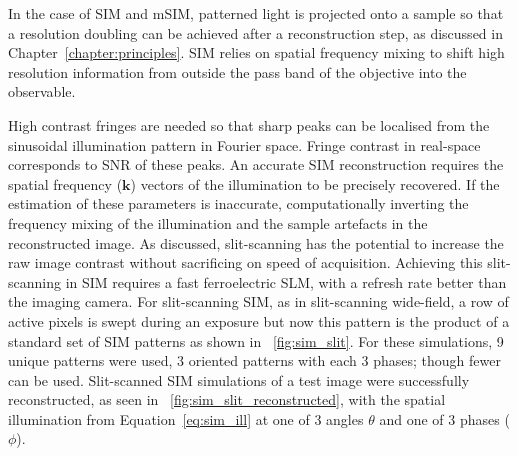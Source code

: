 In the case of \gls{SIM} and \gls{mSIM}, patterned light is projected onto a sample so that a resolution doubling can be achieved after a reconstruction step, as discussed in Chapter~\ref{chapter:principles}.
\gls{SIM} relies on spatial frequency mixing to shift high resolution information from outside the pass band of the objective into the observable.

High contrast fringes are needed so that sharp peaks can be localised from the sinusoidal illumination pattern in Fourier space.
Fringe contrast in real-space corresponds to \gls{SNR} of these peaks.
An accurate \gls{SIM} reconstruction requires the spatial frequency (\(\mathbf{k}\)) vectors of the illumination to be precisely recovered.
If the estimation of these parameters is inaccurate, computationally inverting the frequency mixing of the illumination and the sample artefacts in the reconstructed image.
As discussed, \gls{slit-scanning} has the potential to increase the raw image contrast without sacrificing on speed of acquisition.
Achieving this slit-scanning in \gls{SIM} requires a fast ferroelectric \gls{SLM}, with a refresh rate better than the imaging camera.
For slit-scanning \gls{SIM}, as in slit-scanning \gls{wide-field}, a row of active pixels is swept during an exposure but now this pattern is the product of a standard set of \gls{SIM} patterns as shown in \figurename~\ref{fig:sim_slit}.
For these simulations, 9 unique patterns were used, 3 oriented patterns with each 3 phases; though fewer can be used\cite{strohlSpeedLimitsStructured2017}.
Slit-scanned \gls{SIM} simulations of a test image were successfully reconstructed, as seen in \figurename~\ref{fig:sim_slit_reconstructed}, with the spatial illumination from Equation~\eqref{eq:sim_ill} at one of 3 angles \(\theta \) and one of 3 phases (\(\phi \)).
